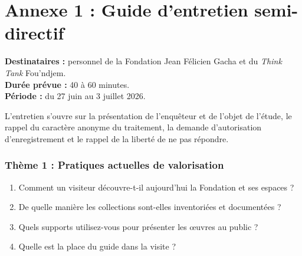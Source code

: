 \cleardoublepage
{}

\setcounter{table}{0}
\renewcommand{\thetable}{A.\arabic{table}}
\setcounter{figure}{0}
\renewcommand{\thefigure}{A.\arabic{figure}}

\chapter*{Annexe 1 : Guide d'entretien semi-directif}
\label{ann:guide}

\textbf{Destinataires :} personnel de la Fondation Jean Félicien Gacha et du
\emph{Think Tank} Fou'ndjem.\\
\textbf{Durée prévue :} 40 à 60 minutes.\\
\textbf{Période :} du 27 juin au 3 juillet 2026.

L'entretien s'ouvre sur la présentation de l'enquêteur et de l'objet de
l'étude, le rappel du caractère anonyme du traitement, la demande
d'autorisation d'enregistrement et le rappel de la liberté de ne pas répondre.

\subsection*{Thème 1 : Pratiques actuelles de valorisation}

\begin{enumerate}
  \item Comment un visiteur découvre-t-il aujourd'hui la Fondation et ses
        espaces ?
  \item De quelle manière les collections sont-elles inventoriées et
        documentées ?
  \item Quels supports utilisez-vous pour présenter les œuvres au public ?
  \item Quelle est la place du guide dans la visite ?
\end{enumerate}

